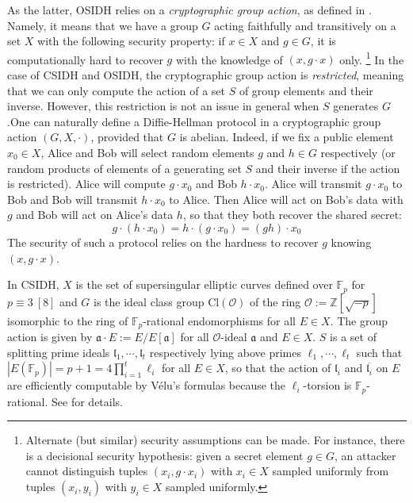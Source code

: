 \documentclass[a4paper,10pt]{report}
\theoremstyle{definition}
\theoremstyle{plain}
\theoremstyle{definition}
\newcommand{\Z}{\mathbb{Z}}
\newcommand{\F}{\mathbb{F}}
\newcommand{\mO}{\mathcal{O}}
\renewcommand{\(}{\left(}
\renewcommand{\)}{\right)}
\newcommand{\mf}[1]{\mathfrak{#1}}
\begin{document}
As the latter, OSIDH relies on a \emph{cryptographic group action}, as defined in \cite{DeFeo1}. Namely, it means that we have a group $G$ acting faithfully and transitively on a set $X$ with the following security property: if $x\in X$ and $g\in G$, it is computationally hard to recover $g$ with the knowledge of $(x,g\cdot x)$ only. \footnote{Alternate (but similar) security assumptions can be made. For instance, there is a decisional security hypothesis: given a secret element $g\in G$, an attacker cannot distinguish tuples $(x_i, g\cdot x_i)$ with $x_i\in X$ sampled uniformly from tuples $(x_i,y_i)$ with $y_i\in X$ sampled uniformly.} In the case of CSIDH and OSIDH, the cryptographic group action is \emph{restricted}, meaning that we can only compute the action of a set $S$ of group elements and their inverse. However, this restriction is not an issue in general when $S$ generates $G$.One can naturally define a Diffie-Hellman protocol in a cryptographic group action $(G,X,\cdot)$, provided that $G$ is abelian. Indeed, if we fix a public element $x_0\in X$, Alice and Bob will select random elements $g$ and $h\in G$ respectively (or random products of elements of a generating set $S$ and their inverse if the action is restricted). Alice will compute $g\cdot x_0$ and Bob $h\cdot x_0$. Alice will transmit $g\cdot x_0$ to Bob and Bob will transmit $h\cdot x_0$ to Alice. Then Alice will act on Bob's data with $g$ and Bob will act on Alice's data $h$, so that they both recover the shared secret:
\[g\cdot(h\cdot x_0)=h\cdot(g\cdot x_0)=(gh)\cdot x_0\]
The security of such a protocol relies on the hardness to recover $g$ knowing $(x,g\cdot x)$.

In CSIDH,  $X$ is the set of supersingular elliptic curves defined over $\F_p$ for $p\equiv 3 \ [8]$ and $G$ is the ideal class group $\mbox{Cl}(\mO)$ of the ring $\mO:=\Z[\sqrt{-p}]$ isomorphic to the ring of $\F_p$-rational endomorphisms for all $E\in X$. The group action is given by $\mf{a}\cdot E:=E/E[\mf{a}]$ for all $\mO$-ideal $\mf{a}$ and $E\in X$. $S$ is a set of splitting prime ideals $\mf{l}_1, \cdots, \mf{l}_t$ respectively lying above primes $\ell_1, \cdots, \ell_t$ such that $|E(\F_p)|=p+1=4\prod_{i=1}^t\ell_i$ for all $E\in X$, so that the action of $\mf{l}_i$ and $\overline{\mf{l}_i}$ on $E$ are efficiently computable by V\'{e}lu's formulas \cite{Velu} because the $\ell_i$-torsion is $\F_p$-rational.  See \cite{CSIDH} for details.  
\end{document}
